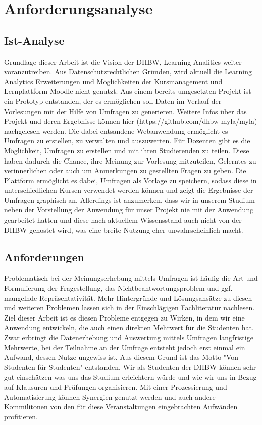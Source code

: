 \chapter{Anforderungsanalyse}
\section{Ist-Analyse}
Grundlage dieser Arbeit ist die Vision der DHBW, Learning Analitics weiter voranzutreiben. Aus Datenschutzrechtlichen Gründen, wird aktuell die Learning Analytics Erweiterungen und Möglichkeiten der Kursmanagement und Lernplattform Moodle nicht genutzt. Aus einem bereits umgesetzten Projekt ist ein Prototyp entstanden, der es ermöglichen soll Daten im Verlauf der Vorlesungen mit der Hilfe von Umfragen zu generieren. Weitere Infos über das Projekt und deren Ergebnisse können hier (https://github.com/dhbw-myla/myla) nachgelesen werden. Die dabei entsandene Webanwendung ermöglicht es Umfragen zu erstellen, zu verwalten und auszuwerten. Für Dozenten gibt es die Möglichkeit, Umfragen zu erstellen und mit ihren Studierenden zu teilen. Diese haben dadurch die Chance, ihre Meinung zur Vorlesung mitzuteilen, Gelerntes zu verinnerlichen oder auch um Anmerkungen zu gestellten Fragen zu geben. Die Plattform ermöglicht es dabei, Umfragen als Vorlage zu speichern, sodass diese in unterschiedlichen Kursen verwendet werden können und zeigt die Ergebnisse der Umfragen graphisch an. Allerdings ist anzumerken, dass wir in unserem Studium neben der Vorstellung der Anwendung für unser Projekt nie mit der Anwendung gearbeitet hatten und diese nach aktuellem Wissensstand auch nicht von der DHBW gehostet wird, was eine breite Nutzung eher unwahrscheinlich macht. 
\section{Anforderungen}
Problematisch bei der Meinungserhebung mittels Umfragen ist häufig die Art und Formulierung der Fragestellung, das Nichtbeantwortungsproblem und ggf. mangelnde Repräsentativität. Mehr Hintergründe und Lösungsansätze zu diesen und weiteren Problemen lassen sich in der Einschlägigen Fachliteratur nachlesen. Ziel dieser Arbeit ist es diesen Probleme entgegen zu Wirken, in dem wir eine Anwendung entwickeln, die auch einen direkten Mehrwert für die Studenten hat. Zwar erbringt die Datenerhebung und Auswertung mittels Umfragen langfristige Mehrwerte, bei der Teilnahme an der Umfrage entsteht jedoch erst einmal ein Aufwand, dessen Nutze ungewiss ist. Aus diesem Grund ist das Motto "Von Studenten für Studenten" entstanden. Wir als Studenten der DHBW können sehr gut einschätzen was uns das Studium erleichtern würde und wie wir uns in Bezug auf Klausuren und Prüfungen organisieren. Mit einer Prozessierung und Automatisierung können Synergien genutzt werden und auch andere Kommilitonen von den für diese Veranstaltungen eingebrachten Aufwänden profitieren. 

